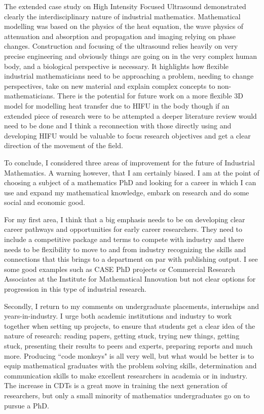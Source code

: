 \documentclass[11pt]{article} %
\begin{document}
The extended case study on High Intensity Focused Ultrasound demonstrated clearly the interdisciplinary nature of industrial mathematics. Mathematical modelling was based on the physics of the heat equation, the  wave physics of attenuation and absorption and propagation and imaging relying on phase changes. Construction and focusing of the ultrasound relies heavily on very precise engineering and obviously things are going on in the very complex human body, and a biological perspective is necessary. It highlights how flexible industrial mathematicians need to be approaching a problem, needing to change perspectives, take on new material and explain complex concepts to non-mathematicians. 
There is the potential for future work on a more flexible 3D model for modelling heat transfer due to HIFU in the body though if an extended piece of research were to be attempted a deeper literature review would need to be done and I think a reconnection with those directly using and developing HIFU would be valuable to focus research objectives and get a clear direction of the movement of the field. 

To conclude, I considered three areas of improvement for the future of Industrial Mathematics. A warning however, that  I am certainly biased. I am at the point of choosing a subject of a mathematics PhD and looking for a career in which I can use and expand my mathematical knowledge, embark on research and do some social and economic good. 

For my first area, I think that a big emphasis needs to be on developing clear career pathways and opportunities for early career researchers. They need to include a competitive package and terms to compete with industry and there needs to be flexibility to move to and from industry recognizing the skills and connections that this brings to a department on par with publishing output. I see some good examples such as CASE PhD projects or  Commercial Research Associates at the Institute for Mathematical Innovation but not clear options for progression in this type of industrial research. 

Secondly, I return to my comments on undergraduate placements, internships and years-in-industry. I urge both academic institutions and industry to work together when setting up projects, to ensure that students get a clear idea of the nature of research: reading papers, getting stuck, trying new things, getting stuck, presenting their results to peers and experts, preparing reports and much more. Producing ``code monkeys" is all very well, but what would be better is to equip mathematical graduates with the problem solving skills, determination and communication skills to make excellent researchers in academia or in industry. The increase in CDTs is a great move in training the next generation of researchers, but only a small minority of mathematics undergraduates go on to pursue a PhD. 
\end{document}
